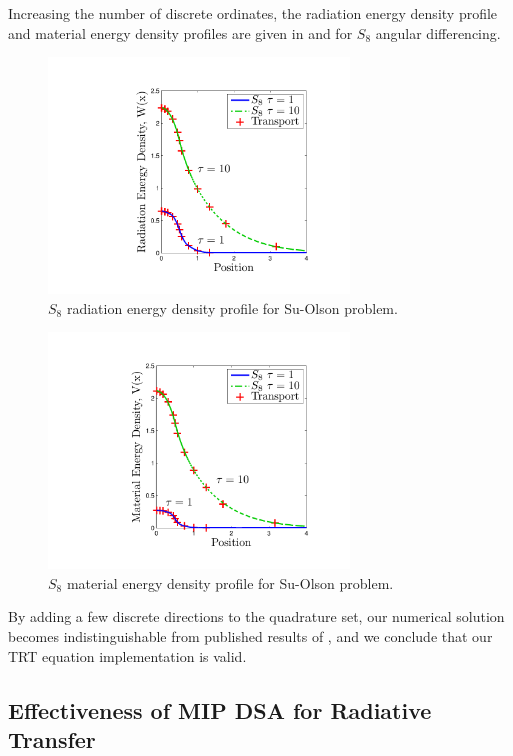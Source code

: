 Increasing the number of discrete ordinates, the radiation energy density profile and material energy density profiles are given in  and  for $S_8$ angular differencing.
\begin{figure}[!htp]
\centering
\includegraphics[width=8cm,trim=1.75in  0.5in 0.75in 0.5in,clip=true]{chapter6_grey_radtran/Dissertation_Data/Su_Olson_S8_Radiation_Energy.pdf}
\caption{$S_8$ radiation energy density profile for Su-Olson problem.}
\label{fig:su_olson_s8_rad}
\end{figure}
\begin{figure}[!hbp]
\centering
\includegraphics[width=8cm,trim=1.75in  0.5in 0.75in 0.5in,clip=true]{chapter6_grey_radtran/Dissertation_Data/Su_Olson_S8_Material_Energy.pdf}
\caption{$S_8$ material energy density profile for Su-Olson problem.}
\label{fig:su_olson_s8_mat}
\end{figure}
By adding a few discrete directions to the quadrature set, our numerical solution becomes indistinguishable from published results of \cite{su_olson_1}, and we conclude that our TRT equation implementation is valid.

\subsection{Effectiveness of MIP DSA for Radiative Transfer}

